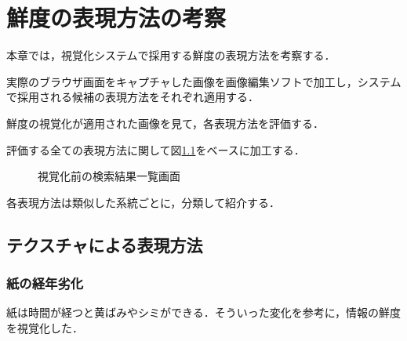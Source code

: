 \chapter{鮮度の表現方法の考察}
\label{chap:verification}

本章では，視覚化システムで採用する鮮度の表現方法を考察する．

実際のブラウザ画面をキャプチャした画像を画像編集ソフトで加工し，システムで採用される候補の表現方法をそれぞれ適用する．

鮮度の視覚化が適用された画像を見て，各表現方法を評価する．

\newpage

評価する全ての表現方法に関して図\ref{fig:ver-base}をベースに加工する．

\begin{figure}[htbp]
  \begin{center}
  \end{center}
  \caption{視覚化前の検索結果一覧画面}
  \label{fig:ver-base}
\end{figure}

各表現方法は類似した系統ごとに，分類して紹介する．

\section{テクスチャによる表現方法}
\label{sec:ver-texture}

\subsection{紙の経年劣化}
\label{subsec:ver-tex-sheet}

紙は時間が経つと黄ばみやシミができる．そういった変化を参考に，情報の鮮度を視覚化した．

